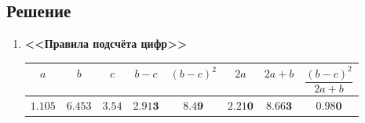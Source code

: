 \documentclass[a4paper, 14pt, fleqn]{extarticle}
\begin{document}
		\subsection{Решение}
			\begin{enumerate}
				\item \textbf{<<Правила подсчёта цифр>>}
					\begin{center}
						\begin{tabular}{ |c|c|c|c|c|c|c|c| }
							\hline
							 \( a \) & \( b \) &  \( c \) &  \( b - c \) & \( (b-c)^2 \) & \( 2a \) & \( 2a  +  b \) &  \( \dfrac{ (b-c)^2 }{ 2a + b} \) \\
							\hline
							\( 1.105 \) & \( 6.453 \) & \( 3.54 \) & \( 2.91\mathbf{3} \) & \( 8.4\mathbf{9} \) & \( 2.21\mathbf{0} \) & \( 8.66\mathbf{3} \) & \( 0.98\mathbf{0} \) \\
							\hline
						\end{tabular}
					\end{center}
			

\end{enumerate}
\end{document}
